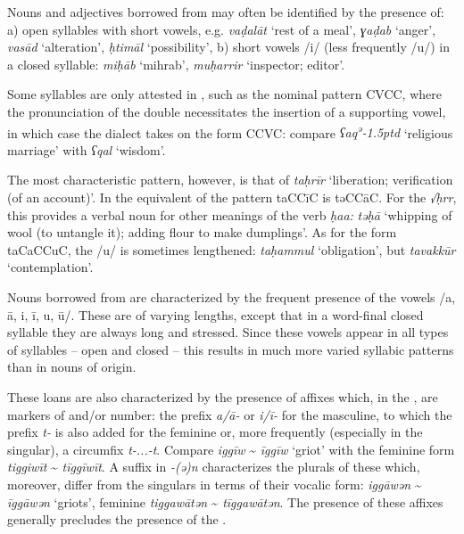 \documentclass[output=paper]{langsci/langscibook}
\begin{document}
Nouns and adjectives borrowed from   may often be identified by the presence of: a) open syllables with short vowels, e.g. \textit{vaḍa}\textit{lāt} ‘rest of a meal’, \textit{ɣaḍab} ‘anger’, \textit{vasād} ‘alteration’, \textit{ḥtimāl} ‘possibility’, b) short vowels /i/ (less frequently /u/) in a closed syllable: \textit{miḥ{\R}āb} ‘mihrab’, \textit{muḥarrir} ‘inspector; editor’.

Some syllables are only attested in , such as the nominal pattern CVCC, where the pronunciation of the double  necessitates the insertion of a supporting vowel, in which case the dialect takes on the form CCVC: compare \textit{ʕaq\kern 0.5pt\textsuperscript{ə}\kern -1.5ptd} ‘religious marriage’ with \textit{ʕqal} ‘wisdom’.

The most characteristic  pattern, however, is that of \textit{taḥrīr} ‘liberation; verification (of an account)’. In  the equivalent of the pattern taCCīC is təCCāC. For the  \textit{√ḥrr}, this provides a verbal noun for other meanings of the verb \textit{ḥa{\R}{\R}a{\R}:} \textit{təḥ{\R}ā{\R}} ‘whipping of wool (to untangle it); adding flour to make dumplings’. As for the form taCaCCuC, the /u/ is sometimes lengthened: \textit{taḥammul} ‘obligation’, but \textit{tavakkūr} ‘contemplation’.


Nouns borrowed from  are characterized by the frequent presence of the vowels /a, ā, i, ī, u, ū/. These are of varying lengths, except that in a word-final closed syllable they are always long and stressed. Since these vowels appear in all types of syllables – open and closed – this results in much more varied syllabic patterns than in nouns of  origin. 

These loans are also characterized by the presence of affixes which, in the , are markers of  and/or number: the prefix \textit{a/ā-} or \textit{i/ī-} for the masculine, to which the prefix \textit{t-} is also added for the feminine or, more frequently (especially in the singular), a circumfix \textit{t-...-t}. Compare \textit{iggīw} \~{} \textit{īggīw} ‘griot’ with the feminine form \textit{tiggiwīt} \~{} \textit{tīggīwīt}. A suffix in \textit{-(ə)n} characterizes the plurals of these  which, moreover, differ from the singulars in terms of their vocalic form: \textit{iggāwən} \~{} \textit{īggāwən} ‘griots’, feminine \textit{tiggawātən} \~{} \textit{tīggawātən}. The presence of these affixes generally precludes the presence of the  .
\end{document}
